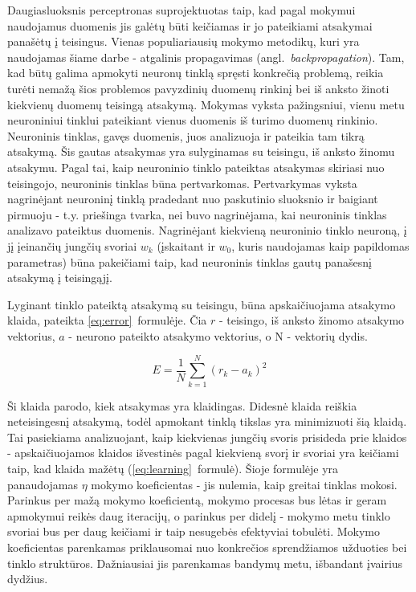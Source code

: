 \documentclass{VUMIFPSbakalaurinis}
\begin{document}
Daugiasluoksnis perceptronas suprojektuotas taip, kad pagal mokymui naudojamus duomenis jis galėtų būti keičiamas ir jo pateikiami atsakymai panašėtų į teisingus.
Vienas populiariausių mokymo metodikų, kuri yra naudojamas šiame darbe - atgalinis propagavimas (angl.~\textit{backpropagation}).
Tam, kad būtų galima apmokyti neuronų tinklą spręsti konkrečią problemą, reikia turėti nemažą šios problemos pavyzdinių duomenų rinkinį bei iš anksto žinoti kiekvienų duomenų teisingą atsakymą.
Mokymas vyksta pažingsniui, vienu metu neuroniniui tinklui pateikiant vienus duomenis iš turimo duomenų rinkinio.
Neuroninis tinklas, gavęs duomenis, juos analizuoja ir pateikia tam tikrą atsakymą.
Šis gautas atsakymas yra sulyginamas su teisingu, iš anksto žinomu atsakymu.
Pagal tai, kaip neuroninio tinklo pateiktas atsakymas skiriasi nuo teisingojo, neuroninis tinklas būna pertvarkomas.
Pertvarkymas vyksta nagrinėjant neuroninį tinklą pradedant nuo paskutinio sluoksnio ir baigiant pirmuoju - t.y. priešinga tvarka, nei buvo nagrinėjama, kai neuroninis tinklas analizavo pateiktus duomenis.
Nagrinėjant kiekvieną neuroninio tinklo neuroną, į jį įeinančių jungčių svoriai $w_k$ (įskaitant ir $w_0$, kuris naudojamas kaip papildomas parametras) būna pakeičiami taip, kad neuroninis tinklas gautų panašesnį atsakymą į teisingąjį.

Lyginant tinklo pateiktą atsakymą su teisingu, būna apskaičiuojama atsakymo klaida, pateikta \ref{eq:error}~formulėje.
Čia $r$ - teisingo, iš anksto žinomo atsakymo vektorius, $a$ - neurono pateikto atsakymo vektorius, o N - vektorių dydis.

\begin{equation} \label{eq:error}
E = \frac{1}{N} \sum_{k=1}^N (r_k - a_k)^2
\end{equation}

Ši klaida parodo, kiek atsakymas yra klaidingas.
Didesnė klaida reiškia neteisingesnį atsakymą, todėl apmokant tinklą tikslas yra minimizuoti šią klaidą.
Tai pasiekiama analizuojant, kaip kiekvienas jungčių svoris prisideda prie klaidos - apskaičiuojamos klaidos išvestinės pagal kiekvieną svorį ir svoriai yra keičiami taip, kad klaida mažėtų (\ref{eq:learning}~formulė).
Šioje formulėje yra panaudojamas $\eta$ mokymo koeficientas - jis nulemia, kaip greitai tinklas mokosi.
Parinkus per mažą mokymo koeficientą, mokymo procesas bus lėtas ir geram apmokymui reikės daug iteracijų, o parinkus per didelį - mokymo metu tinklo svoriai bus per daug keičiami ir taip nesugebės efektyviai tobulėti.
Mokymo koeficientas parenkamas priklausomai nuo konkrečios sprendžiamos užduoties bei tinklo struktūros.
Dažniausiai jis parenkamas bandymų metu, išbandant įvairius dydžius.
\end{document}
